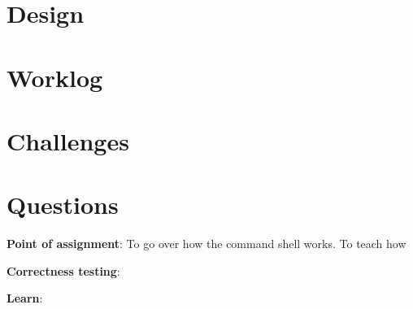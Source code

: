 \documentclass[11pt]{article}
\begin{document}
\section{Design}


\section{Worklog}


\section{Challenges}


\section{Questions}
\textbf{Point of assignment}: To go over how the command shell works. To teach how 


\textbf{Correctness testing}: 


\textbf{Learn}: 
\end{document}
